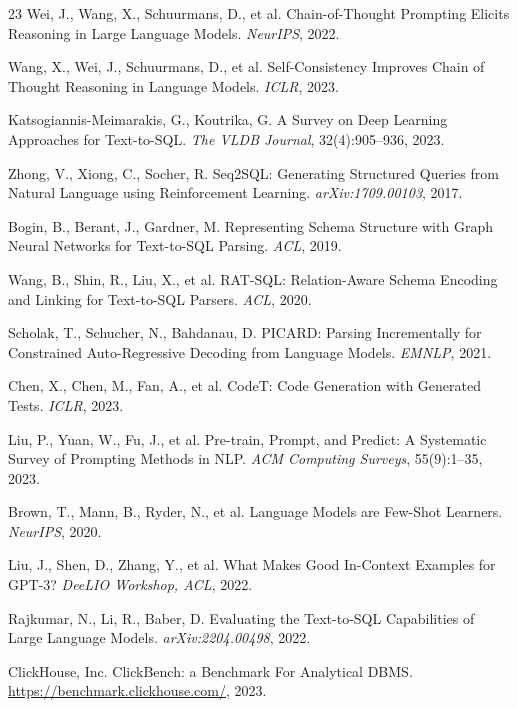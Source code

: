 \documentclass[sigconf, nonacm]{acmart}
\begin{document}
\begin{thebibliography}{23}
 Wei, J., Wang, X., Schuurmans, D., et al. Chain-of-Thought Prompting Elicits Reasoning in Large Language Models. \emph{NeurIPS}, 2022.

 Wang, X., Wei, J., Schuurmans, D., et al. Self-Consistency Improves Chain of Thought Reasoning in Language Models. \emph{ICLR}, 2023.

 Katsogiannis-Meimarakis, G., Koutrika, G. A Survey on Deep Learning Approaches for Text-to-SQL. \emph{The VLDB Journal}, 32(4):905--936, 2023.

 Zhong, V., Xiong, C., Socher, R. Seq2SQL: Generating Structured Queries from Natural Language using Reinforcement Learning. \emph{arXiv:1709.00103}, 2017.

 Bogin, B., Berant, J., Gardner, M. Representing Schema Structure with Graph Neural Networks for Text-to-SQL Parsing. \emph{ACL}, 2019.

 Wang, B., Shin, R., Liu, X., et al. RAT-SQL: Relation-Aware Schema Encoding and Linking for Text-to-SQL Parsers. \emph{ACL}, 2020.

 Scholak, T., Schucher, N., Bahdanau, D. PICARD: Parsing Incrementally for Constrained Auto-Regressive Decoding from Language Models. \emph{EMNLP}, 2021.

 Chen, X., Chen, M., Fan, A., et al. CodeT: Code Generation with Generated Tests. \emph{ICLR}, 2023.

 Liu, P., Yuan, W., Fu, J., et al. Pre-train, Prompt, and Predict: A Systematic Survey of Prompting Methods in NLP. \emph{ACM Computing Surveys}, 55(9):1--35, 2023.

 Brown, T., Mann, B., Ryder, N., et al. Language Models are Few-Shot Learners. \emph{NeurIPS}, 2020.

 Liu, J., Shen, D., Zhang, Y., et al. What Makes Good In-Context Examples for GPT-3? \emph{DeeLIO Workshop, ACL}, 2022.

 Rajkumar, N., Li, R., Baber, D. Evaluating the Text-to-SQL Capabilities of Large Language Models. \emph{arXiv:2204.00498}, 2022.

 ClickHouse, Inc. ClickBench: a Benchmark For Analytical DBMS. \url{https://benchmark.clickhouse.com/}, 2023.

\end{thebibliography}
\end{document}
